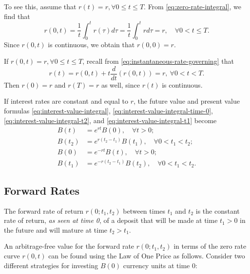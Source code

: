 To see this, assume that $ r(t) = r, \forall 0 \leq t \leq T $.
From \eqref{eq:zero-rate-integral}, we find that
\begin{equation*}
    r(0, t) = \frac{1}{t} \int_{0}^{t} r(\tau) d\tau =
        \frac{1}{t} \int_{0}^{t} r d\tau = r, \quad \forall 0 < t \leq T.
\end{equation*}
Since $ r(0, t) $ is continuous, we obtain that $ r(0, 0) = r $.

If $ r(0, t) = r, \forall 0 \leq t \leq T $, recall from
    \eqref{eq:instantaneous-rate-governing} that
\begin{equation*}
    r(t) = r(0, t) + t \frac{d}{dt} (r(0, t)) = r,\ \forall 0 < t < T.
\end{equation*}
Then $ r(0) = r $ and $ r(T) = r $ as well, since $ r(t) $ is continuous.

If interest rates are constant and equal to $ r $, the future value and present
    value formulas \eqref{eq:interest-value-integral},
    \eqref{eq:interest-value-integral-time-0},
    \eqref{eq:interest-value-integral-t2}, and
    \eqref{eq:interest-value-integral-t1} become
\begin{align}
    B(t) &= e^{rt} B(0), \quad \forall t > 0; \\
    B(t_2) &= e^{r(t_2 - t_1)} B(t_1), \quad \forall 0 < t_1 < t_2; \\
    B(0) &= e^{-rt} B(t), \quad \forall t > 0; \\
    B(t_1) &= e^{-r(t_2 - t_1)} B(t_2), \quad \forall 0 < t_1 < t_2.
\end{align}

\subsection{Forward Rates}
The forward rate of return $ r(0; t_1, t_2) $ between times $ t_1 $ and $ t_2 $
    is the constant rate of return, \textit{as seen at time 0}, of a deposit
    that will be made at time $ t_1 > 0 $ in the future and will mature at time
    $ t_2 > t_1 $.

An arbitrage-free value for the forward rate $ r(0; t_1, t_2) $ in terms of the
    zero rate curve $ r(0, t) $ can be found using the Law of One Price as
    follows.
Consider two different strategies for investing $ B(0) $ currency units at time
    0:

